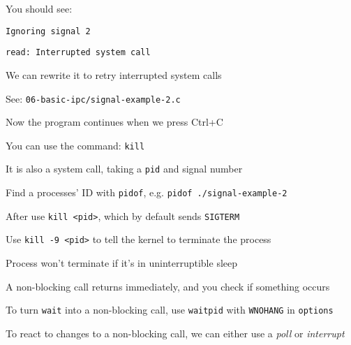   \begin{slide}


    You should see:

    \leftspace{}\texttt{Ignoring signal 2}

    \leftspace{}\texttt{read: Interrupted system call}
    \medskip

    We can rewrite it to retry interrupted system calls

    \leftspace{}See: \texttt{06-basic-ipc/signal-example-2.c}
    \medskip

    Now the program continues when we press Ctrl+C

  \end{slide}

  \begin{slide}


    You can use the command: \texttt{kill}

    \leftspace{}It is also a system call, taking a \texttt{pid} and signal number
    \medskip

    Find a processes' ID with \texttt{pidof}, e.g. \texttt{pidof ./signal-example-2}
    \medskip

    After use \texttt{kill <pid>}, which by default sends \texttt{SIGTERM}
    \medskip

    Use \texttt{kill -9 <pid>} to tell the kernel to terminate the process

    \leftspace{}Process won't terminate if it's in uninterruptible sleep

  \end{slide}

  \begin{slide}


    A non-blocking call returns immediately, and you check if something occurs
    \medskip

    To turn \texttt{wait} into a non-blocking call, use \texttt{waitpid} with
    \texttt{WNOHANG} in \texttt{options}
    \medskip

    To react to changes to a non-blocking call, we can either use a
    \textit{poll} or \textit{interrupt}

  \end{slide}

